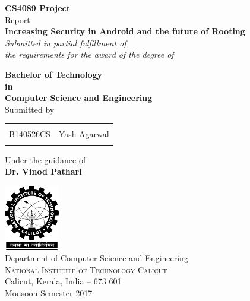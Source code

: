 \begin{titlepage}

\begin{center}

\textup{\small {\bf CS4089 Project} \\ Report}\\[0.2in]

\Large \textbf {Increasing Security in Android and the future of Rooting}\\[0.5in]

       \small \emph{Submitted in partial fulfillment of\\
        the requirements for the award of the degree of}
        \vspace{.2in}

       {\bf Bachelor of Technology \\in\\ Computer Science and Engineering}\\[0.5in]

\normalsize Submitted by \\
\begin{table}[h]
\centering
\begin{tabular}{lr}\\ \hline
\\
B140526CS & Yash Agarwal \\ \\ \hline 
\end{tabular}
\end{table}

\vspace{.1in}
Under the guidance of\\
{\textbf{Dr. Vinod Pathari}}\\[0.2in]

\vfill

\includegraphics[width=0.18\textwidth]{./nitc-logo}\\[0.1in]
\Large{Department of Computer Science and Engineering}\\
\normalsize
\textsc{National Institute of Technology Calicut}\\
Calicut, Kerala, India -- 673 601 \\
\vspace{0.2cm}
Monsoon Semester 2017

\end{center}

\end{titlepage}
